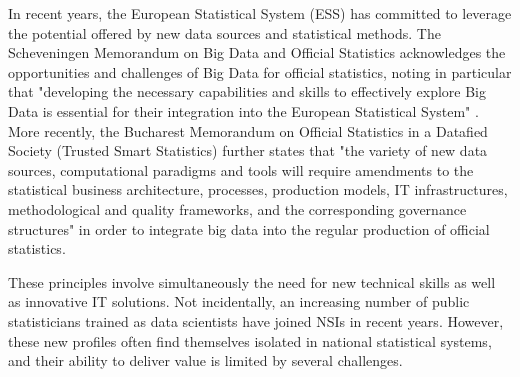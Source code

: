 In recent years, the European Statistical System (ESS) has committed to leverage the potential offered
by new data sources and statistical methods. The Scheveningen Memorandum on Big Data and Official Statistics
acknowledges the opportunities and challenges of Big Data for official statistics,
noting in particular that "developing the necessary capabilities and skills to effectively explore
Big Data is essential for their integration into the European Statistical System" \cite{scheveningen2013}.
More recently, the Bucharest Memorandum on Official Statistics in a Datafied Society (Trusted Smart Statistics)
\cite{bucharest2018} further states that "the variety of new data sources, computational paradigms and tools
will require amendments to the statistical business architecture, processes, production models, IT
infrastructures, methodological and quality frameworks, and the corresponding governance structures" in order
to integrate big data into the regular production of official statistics.

These principles involve simultaneously the need for new technical skills as well as innovative IT solutions. Not incidentally, an increasing number of public statisticians trained as data scientists have joined NSIs in recent years. However, these new profiles often find themselves isolated in national statistical systems, and their ability to deliver value is limited by several challenges.